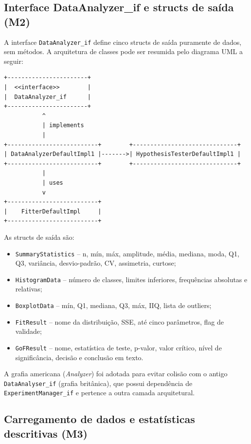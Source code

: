 \subsection{Interface DataAnalyzer\_if e structs de saída (M2)}

A interface \texttt{DataAnalyzer\_if} define cinco structs de saída puramente de dados, sem métodos. A arquitetura de classes pode ser resumida pelo diagrama UML a seguir:

\begin{verbatim}
+-----------------------+
|  <<interface>>        |
|  DataAnalyzer_if      |
+-----------------------+
           ^
           | implements
           |
+--------------------------+        +------------------------------+
| DataAnalyzerDefaultImpl1 |------->| HypothesisTesterDefaultImpl1 |
+--------------------------+        +------------------------------+
           |
           | uses
           v
+--------------------------+
|    FitterDefaultImpl     |
+--------------------------+
\end{verbatim}

As structs de saída são:

\begin{itemize}
    \item \texttt{SummaryStatistics} -- n, mín, máx, amplitude, média, mediana, moda, Q1, Q3, variância, desvio-padrão, CV, assimetria, curtose;
    \item \texttt{HistogramData} -- número de classes, limites inferiores, frequências absolutas e relativas;
    \item \texttt{BoxplotData} -- mín, Q1, mediana, Q3, máx, IIQ, lista de outliers;
    \item \texttt{FitResult} -- nome da distribuição, SSE, até cinco parâmetros, flag de validade;
    \item \texttt{GoFResult} -- nome, estatística de teste, p-valor, valor crítico, nível de significância, decisão e conclusão em texto.
\end{itemize}

A grafia americana (\textit{Analyzer}) foi adotada para evitar colisão com o antigo \texttt{DataAnalyser\_if} (grafia britânica), que possui dependência de \texttt{ExperimentManager\_if} e pertence a outra camada arquitetural.

\subsection{Carregamento de dados e estatísticas descritivas (M3)}


